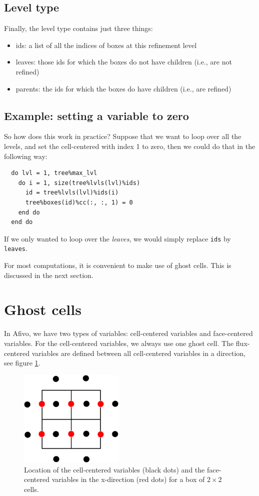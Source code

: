 \documentclass[a4paper, a4wide]{article}
\begin{document}
\subsection{Level type}
\label{sec:level-type}

Finally, the level type contains just three things:
\begin{itemize}
  \item ids: a list of all the indices of boxes at this refinement level
  \item leaves: those ids for which the boxes do not have children (i.e., are
  not refined)
  \item parents: the ids for which the boxes do have children (i.e., are refined)
\end{itemize}

\subsection{Example: setting a variable to zero}
\label{sec:data-types-example}

So how does this work in practice? Suppose that we want to loop over all the
levels, and set the cell-centered with index 1 to zero, then we could do that in
the following way:
\begin{lstlisting}
  do lvl = 1, tree%max_lvl
    do i = 1, size(tree%lvls(lvl)%ids)
      id = tree%lvls(lvl)%ids(i)
      tree%boxes(id)%cc(:, :, 1) = 0
    end do
  end do
\end{lstlisting}
If we only wanted to loop over the \emph{leaves}, we would simply replace \texttt{ids}
by \texttt{leaves}.

For most computations, it is convenient to make use of ghost cells.
This is discussed in the next section.

\section{Ghost cells}
\label{sec:ghost-cells}

In Afivo, we have two types of variables: cell-centered variables and
face-centered variables.
For the cell-centered variables, we always use one ghost cell. The flux-centered
variables are defined between all cell-centered variables in a direction, see
figure \ref{fig:location-cc-fx}.

\begin{figure}
  \centering
  \includegraphics[width=5cm]{figures/location_cc_fx.png}
  \caption{Location of the cell-centered variables (black dots) and the
    face-centered variables in the x-direction (red dots) for a box of $2\times
    2$ cells.}
  \label{fig:location-cc-fx}
\end{figure}
\end{document}
